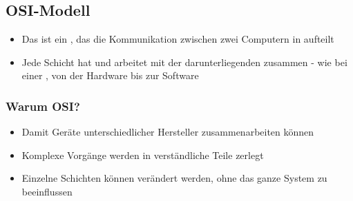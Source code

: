\subsection{OSI-Modell}
\begin{itemize}
    \item Das  ist ein , das die Kommunikation zwischen zwei Computern in  aufteilt
    \item Jede Schicht hat  und arbeitet mit der darunterliegenden zusammen - wie bei einer , von der Hardware bis zur Software
\end{itemize}
\subsubsection*{Warum OSI?}
\begin{itemize}
    \item {} Damit Geräte unterschiedlicher Hersteller zusammenarbeiten können
    \item {} Komplexe Vorgänge werden in verständliche Teile zerlegt
    \item {} Einzelne Schichten können verändert werden, ohne das ganze System zu beeinflussen
\end{itemize}
